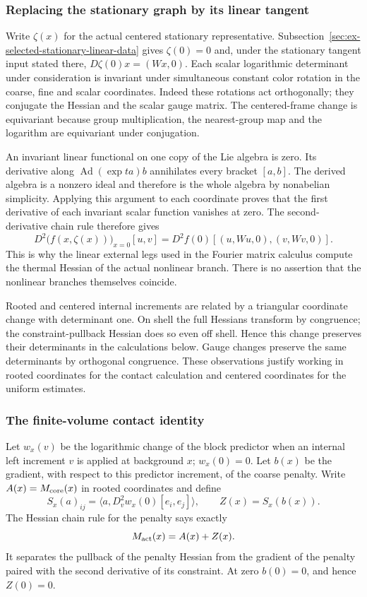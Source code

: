 \subsubsection{Replacing the stationary graph by its linear tangent}
Write $\zeta(x)$ for the actual centered stationary representative.
Subsection~\ref{sec:ex-selected-stationary-linear-data} gives
$\zeta(0)=0$ and, under the stationary tangent input stated there,
$D\zeta(0)x=(Wx,0)$.
Each scalar logarithmic determinant under consideration is invariant
under simultaneous constant color rotation in the coarse, fine and
scalar coordinates. Indeed these rotations act orthogonally; they
conjugate the Hessian and the scalar gauge matrix. The centered-frame
change is equivariant because group multiplication, the nearest-group
map and the logarithm are equivariant under conjugation.

An invariant linear functional on one copy of the Lie algebra is zero.
Its derivative along $\operatorname{Ad}(\exp ta)b$ annihilates every
bracket $[a,b]$. The derived algebra is a nonzero ideal and therefore
is the whole algebra by nonabelian simplicity. Applying this argument
to each coordinate proves that the first derivative of each invariant
scalar function vanishes at zero. The second-derivative chain rule
therefore gives
\[
 D^2\bigl(f(x,\zeta(x))\bigr)_{x=0}[u,v]
   =D^2f(0)[(u,Wu,0),(v,Wv,0)].
\]
This is why the linear external legs used in the Fourier matrix
calculus compute the thermal Hessian of the actual nonlinear branch.
There is no assertion that the nonlinear branches themselves coincide.

Rooted and centered internal increments are related by a triangular
coordinate change with determinant one. On shell the full Hessians
transform by congruence; the constraint-pullback Hessian does so even
off shell. Hence this change preserves their determinants in the
calculations below. Gauge changes preserve the same determinants by
orthogonal congruence. These observations justify working in rooted
coordinates for the contact calculation and centered coordinates for
the uniform estimates.

\subsubsection{The finite-volume contact identity}
Let $w_x(v)$ be the logarithmic change of the block predictor when an
internal left increment $v$ is applied at background $x$; $w_x(0)=0$.
Let $b(x)$ be the gradient, with respect to this predictor increment,
of the coarse penalty. Write $A(x)=M_{\rm core}(x)$ in rooted
coordinates and define
\[
 S_x(a)_{ij}=\langle a,D_v^2w_x(0)[e_i,e_j]\rangle,
 \qquad Z(x)=S_x(b(x)).
\]
The Hessian chain rule for the penalty says exactly
\[
                         M_{\rm act}(x)=A(x)+Z(x).
\]
It separates the pullback of the penalty Hessian from the gradient
of the penalty paired with the second derivative of its constraint.
At zero $b(0)=0$, and hence $Z(0)=0$.

